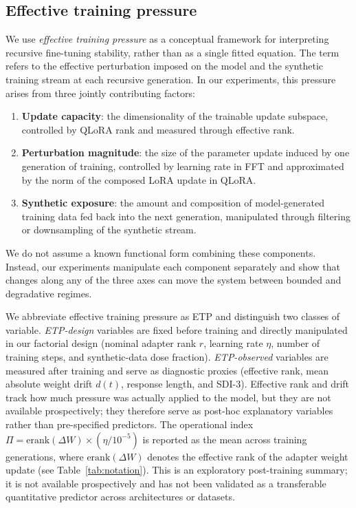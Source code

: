 \documentclass[a4paper,fleqn]{cas-dc}
\newif\ifshowchanges
\newcommand{\rev}[1]{\ifshowchanges{\color{blue}#1}\else{#1}\fi}
\begin{document}
\subsection{Effective training pressure}\label{sec:pressure}

We use \textit{effective training pressure} as a conceptual framework for
interpreting recursive fine-tuning stability, rather than as a single fitted
equation. The term refers to the effective perturbation imposed on the model and
the synthetic training stream at each recursive generation. In our experiments,
this pressure arises from three jointly contributing factors:

\begin{enumerate}
    \item \textbf{Update capacity}: the dimensionality of the trainable update
    subspace, controlled by QLoRA rank and measured through effective rank.

    \item \textbf{Perturbation magnitude}: the size of the parameter update
    induced by one generation of training, controlled by learning rate in FFT and
    approximated by the norm of the composed LoRA update in QLoRA.

    \item \textbf{Synthetic exposure}: the amount and composition of
    model-generated training data fed back into the next generation, manipulated
    through filtering or downsampling of the synthetic stream.
\end{enumerate}

We do not assume a known functional form combining these components. Instead,
our experiments manipulate each component separately and show that changes along
any of the three axes can move the system between bounded and degradative
regimes.

\rev{We abbreviate effective training pressure as ETP and distinguish two classes of variable. \emph{ETP-design} variables are fixed before training and
directly manipulated in our factorial design (nominal adapter rank $r$, learning
rate $\eta$, number of training steps, and synthetic-data dose fraction). \emph{ETP-observed} variables are measured after training and serve as diagnostic
proxies (effective rank, mean absolute weight drift $d(t)$, response length, and
SDI-3). Effective rank and drift track how much pressure was actually applied to
the model, but they are not available prospectively; they therefore serve as
post-hoc explanatory variables rather than pre-specified predictors. The
operational index $\Pi = \mathrm{erank}(\Delta W) \times (\eta / 10^{-5})$ is reported as the mean across training generations, where $\mathrm{erank}(\Delta W)$ denotes the effective rank of the adapter weight update (see Table~\ref{tab:notation}). This is
an exploratory post-training summary; it is not available prospectively and has not been validated as a transferable quantitative predictor across architectures or datasets.}
\end{document}
